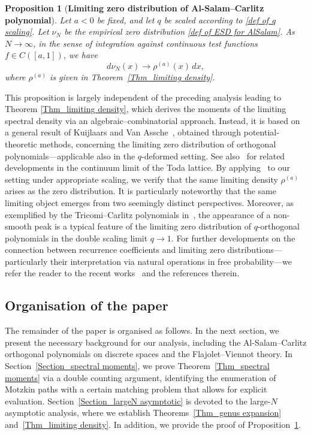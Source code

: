 \documentclass{amsart}
\theoremstyle{plain}
\newtheorem{prop}[thm]{Proposition}
\theoremstyle{remark}
\numberwithin{equation}{section}
\begin{document}
\begin{prop}[\textbf{Limiting zero distribution of Al-Salam--Carlitz polynomial}]\label{prop:Asymptotic zero distribution}
Let $a < 0$ be fixed, and let $q$ be scaled according to \eqref{def of q scaling}. Let $\nu_N$ be the empirical zero distribution \eqref{def of ESD for AlSalam}. As $N \to \infty$, in the sense of integration against continuous test functions $f \in C([a,1])$, we have  
\begin{equation}
d\nu_N(x) \to  \rho^{(a)}(x)\,dx,
\end{equation} 
where $\rho^{(a)}$ is given in Theorem~\ref{Thm_limiting density}. 
\end{prop}

This proposition is largely independent of the preceding analysis leading to Theorem \ref{Thm_limiting density}, which derives the moments of the limiting spectral density via an algebraic--combinatorial approach. Instead, it is based on a general result of Kuijlaars and Van Assche~\cite[Theorem 1.4]{KA99}, obtained through potential-theoretic methods, concerning the limiting zero distribution of orthogonal polynomials---applicable also in the \( q \)-deformed setting. See also~\cite{DM98} for related developments in the continuum limit of the Toda lattice.
By applying~\cite[Theorem 1.4]{KA99} to our setting under appropriate scaling, we verify that the same limiting density \( \rho^{(a)} \) arises as the zero distribution. It is particularly noteworthy that the same limiting object emerges from two seemingly distinct perspectives. Moreover, as exemplified by the Tricomi--Carlitz polynomials in~\cite{KA99}, the appearance of a non-smooth peak is a typical feature of the limiting zero distribution of \( q \)-orthogonal polynomials in the double scaling limit \( q \to 1 \).
For further developments on the connection between recurrence coefficients and limiting zero distributions---particularly their interpretation via natural operations in free probability---we refer the reader to the recent works~\cite{JKM25,AFPU24} and the references therein.

\medskip 


  


\subsection*{Organisation of the paper} The remainder of the paper is organised as follows. In the next section, we present the necessary background for our analysis, including the Al-Salam--Carlitz orthogonal polynomials on discrete spaces and the Flajolet--Viennot theory. In Section~\ref{Section_spectral moments}, we prove Theorem~\ref{Thm_spectral moments} via a double counting argument, identifying the enumeration of Motzkin paths with a certain matching problem that allows for explicit evaluation. Section~\ref{Section_largeN asymptotic} is devoted to the large-\( N \) asymptotic analysis, where we establish Theorems~\ref{Thm_genus expansion} and~\ref{Thm_limiting density}. In addition, we provide the proof of Proposition~\ref{prop:Asymptotic zero distribution}.
\end{document}
